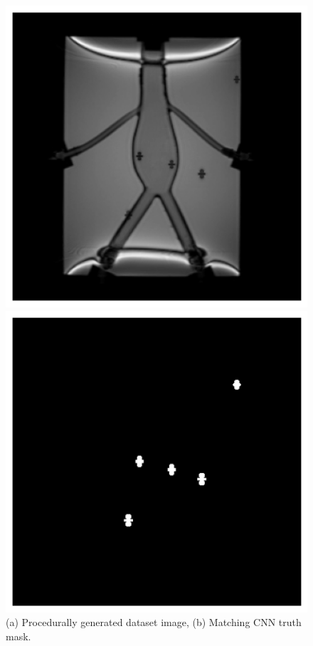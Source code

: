 \documentclass[conference]{IEEEtran}
\begin{document}
\begin{figure}[h]
    \centering
    \begin{minipage}{0.241\textwidth}
        \centering
        \includegraphics[width=\textwidth]{Conference/img/generated-image.png}
    \end{minipage}\hfill \hspace*{0cm}
    \begin{minipage}{0.241\textwidth}
        \centering
        \includegraphics[width=\textwidth]{Conference/img/generated-image-truth.png}
    \end{minipage}\hfill \hspace*{0cm}
    \caption{(a) Procedurally generated dataset image,
    (b) Matching CNN truth mask.}
    \label{fig:generated-dataset-and-truth}
\end{figure}
\end{document}
